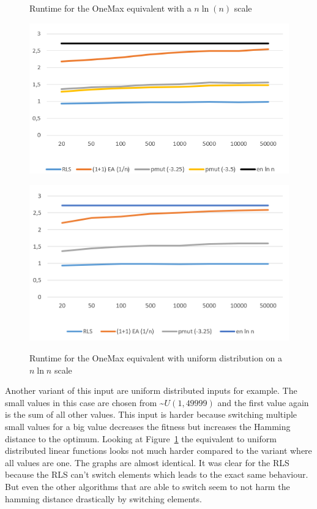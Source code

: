 \begin{figure}[h]
      \centering
      \begin{minipage}[b]{0.45\textwidth}
            \caption{Runtime for the OneMax equivalent with a $n\ln(n)$ scale}
            \includegraphics[width=\textwidth]{figures/images/oneMaxMultipleN.png}\label{fig:onemaxNlogNBound}
      \end{minipage}
      \hspace{0.75cm}
      \begin{minipage}[b]{0.45\textwidth}
            \caption{Runtime for the OneMax equivalent with uniform distribution on a $n\ln n$ scale}
            \includegraphics[width=\textwidth]{figures/images/oneMaxUniformMultipleN.png}\label{fig:onemaxUniformNlogNBound}
      \end{minipage}
\end{figure}

Another variant of this input are uniform distributed inputs for example.
The small values in this case are chosen from \textasciitilde$U(1,49999)$ and the first value again is the sum of all other values.
This input is harder because switching multiple small values for a big value decreases the fitness but increases the Hamming distance to the optimum.
Looking at Figure~\ref{fig:onemaxUniformNlogNBound} the equivalent to uniform distributed linear functions looks not much harder compared to the variant where all values are one.
The graphs are almost identical.
It was clear for the RLS because the RLS can't switch elements which leads to the exact same behaviour.
But even the other algorithms that are able to switch seem to not harm the hamming distance drastically by switching elements.

